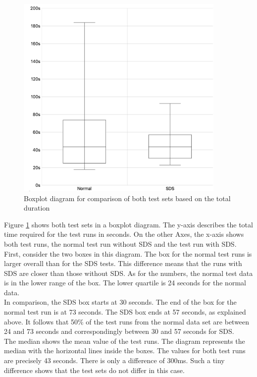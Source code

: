 \begin{figure}[htbp]
    \centerline{
    \includegraphics[height=10cm]{images/box_plot_total_duration.png}}
\caption{Boxplot diagram for comparison of both test sets based on the total duration}
\label{box_plot_comparison}
\end{figure}
Figure \ref{box_plot_comparison} shows both test sets in a boxplot diagram. The y-axis describes the total time required for the test runs in seconds. On the other Axes, the x-axis shows both test runs, the normal test run without \ac{SDS} and the test run with \ac{SDS}. \\
First, consider the two boxes in this diagram. The box for the normal test runs is larger overall than for the \ac{SDS} tests. This difference means that the runs with \ac{SDS} are closer than those without \ac{SDS}. As for the numbers, the normal test data is in the lower range of the box. The lower quartile is 24 seconds for the normal data. \\
In comparison, the \ac{SDS} box starts at 30 seconds. The end of the box for the normal test run is at 73 seconds. The \ac{SDS} box ends at 57 seconds, as explained above. It follows that 50\% of the test runs from the normal data set are between 24 and 73 seconds and correspondingly between 30 and 57 seconds for \ac{SDS}.  \\
The median shows the mean value of the test runs. The diagram represents the median with the horizontal lines inside the boxes. The values for both test runs are precisely 43 seconds. There is only a difference of 300ms. Such a tiny difference shows that the test sets do not differ in this case. \\
